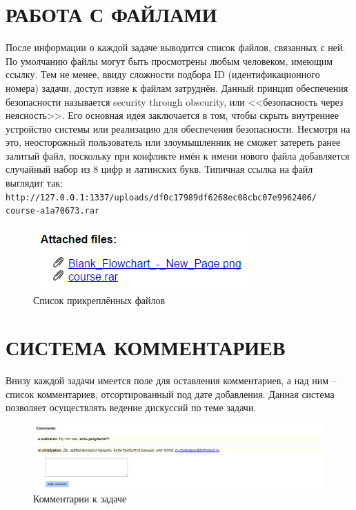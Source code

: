 \documentclass[14pt, a4paper]{extreport}
\begin{document}
\section{\MakeTextUppercase{Работа с файлами}}

После информации о каждой задаче выводится список файлов, связанных с ней. По умолчанию файлы могут быть просмотрены любым человеком, имеющим ссылку. Тем не менее, ввиду сложности подбора ID (идентификационного номера) задачи, доступ извне к файлам затруднён. Данный принцип обеспечения безопасности называется security through obscurity, или <<безопасность через неясность>>. Его основная идея заключается в том, чтобы скрыть внутреннее устройство системы или реализацию для обеспечения безопасности. Несмотря на это, неосторожный пользователь или злоумышленник не сможет затереть ранее залитый файл, поскольку при конфликте имён к имени нового файла добавляется случайный набор из 8 цифр и латинских букв. Типичная ссылка на файл выглядит так: \\
{\tt http://127.0.0.1:1337/uploads/df0c17989df6268ec08cbc07e9962406/ \\
course-a1a70673.rar}

\begin{figure}[!htb]
  \centering
    \includegraphics[scale=0.75]{../shared_images/frontend/files.png}
   \caption{Список прикреплённых файлов}
    \label{fig:start}
\end{figure}

\section{\MakeTextUppercase{Система комментариев}}

Внизу каждой задачи имеется поле для оставления комментариев, а над ним -- список комментариев, отсортированный под дате добавления. Данная система позволяет осуществлять ведение дискуссий по теме задачи.

\begin{figure}[!htb]
  \centering
    \includegraphics[scale=0.6]{../shared_images/frontend/comments.png}
   \caption{Комментарии к задаче}
    \label{fig:start}
\end{figure}
\end{document}
